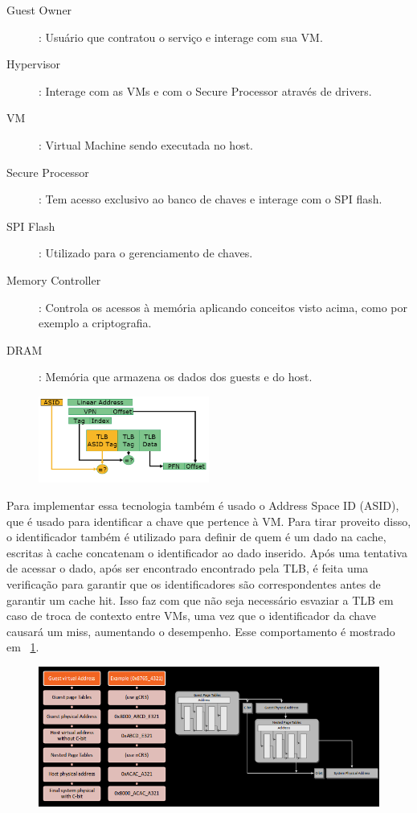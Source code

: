 \documentclass{report}
\begin{document}
\begin{description}
    \item[Guest Owner]: Usuário que contratou o serviço e interage com sua VM.
    \item[Hypervisor]: Interage com as VMs e com o Secure Processor através de
    drivers.
    \item[VM]: Virtual Machine sendo executada no host.
    \item[Secure Processor]: Tem acesso exclusivo ao banco de chaves e interage
    com o SPI flash.
    \item[SPI Flash]: Utilizado para o gerenciamento de chaves.
    \item[Memory Controller]: Controla os acessos à memória aplicando
    conceitos visto acima, como por exemplo a criptografia.
    \item[DRAM]: Memória que armazena os dados dos guests e do host.
\end{description}

\begin{figure}[h]
    \centering
    \includegraphics[width=0.5\textwidth]{img/asid}
    \label{asid}
\end{figure}

Para implementar essa tecnologia também é usado o Address Space ID (ASID), que
é usado para identificar a chave que pertence à VM. Para tirar proveito disso, o identificador
também é utilizado para definir de quem é um dado na cache, escritas à cache
concatenam o identificador ao dado inserido. Após uma tentativa de acessar o dado, após ser encontrado
encontrado pela TLB, é feita uma verificação para garantir que os
identificadores são correspondentes antes de garantir um cache hit. Isso faz
com que não seja necessário esvaziar a TLB em caso de troca de contexto entre
VMs, uma vez que o identificador da chave causará um miss, aumentando
o desempenho. Esse comportamento é mostrado em ~\ref{asid}.

\begin{figure}[h]
    \centering
    \includegraphics[width=1\textwidth]{img/sev-address-translation}
    \label{sev-address-translation}
\end{figure}
\end{document}
